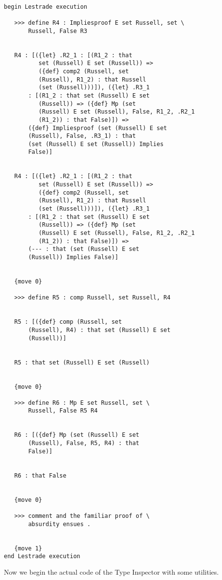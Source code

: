 \documentclass[12pt]{article}
\begin{document}
\begin{verbatim}

begin Lestrade execution

   >>> define R4 : Impliesproof E set Russell, set \
       Russell, False R3


   R4 : [({let} .R2_1 : [(R1_2 : that 
          set (Russell) E set (Russell)) => 
          ({def} comp2 (Russell, set 
          (Russell), R1_2) : that Russell 
          (set (Russell)))]), ({let} .R3_1 
       : [(R1_2 : that set (Russell) E set 
          (Russell)) => ({def} Mp (set 
          (Russell) E set (Russell), False, R1_2, .R2_1 
          (R1_2)) : that False)]) => 
       ({def} Impliesproof (set (Russell) E set 
       (Russell), False, .R3_1) : that 
       (set (Russell) E set (Russell)) Implies 
       False)]


   R4 : [({let} .R2_1 : [(R1_2 : that 
          set (Russell) E set (Russell)) => 
          ({def} comp2 (Russell, set 
          (Russell), R1_2) : that Russell 
          (set (Russell)))]), ({let} .R3_1 
       : [(R1_2 : that set (Russell) E set 
          (Russell)) => ({def} Mp (set 
          (Russell) E set (Russell), False, R1_2, .R2_1 
          (R1_2)) : that False)]) => 
       (--- : that (set (Russell) E set 
       (Russell)) Implies False)]


   {move 0}

   >>> define R5 : comp Russell, set Russell, R4


   R5 : [({def} comp (Russell, set 
       (Russell), R4) : that set (Russell) E set 
       (Russell))]


   R5 : that set (Russell) E set (Russell)


   {move 0}

   >>> define R6 : Mp E set Russell, set \
       Russell, False R5 R4


   R6 : [({def} Mp (set (Russell) E set 
       (Russell), False, R5, R4) : that 
       False)]


   R6 : that False


   {move 0}

   >>> comment and the familiar proof of \
       absurdity ensues .


   {move 1}
end Lestrade execution

\end{verbatim}

\newpage

Now we begin the actual code of the Type Inspector with some utilities.
\end{document}
